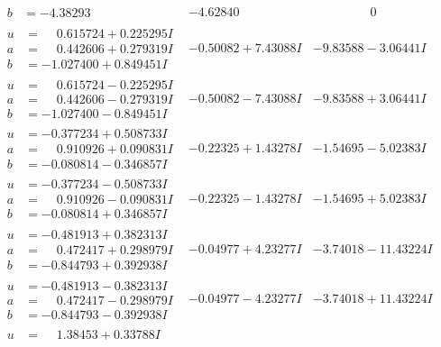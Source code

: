 \documentclass[1p]{elsarticle_modified}
\theoremstyle{definition}
\begin{document}
$$\begin{array}{c|c|c}
\begin{aligned}
b &= -4.38293\phantom{ +0.000000I}\end{aligned}
 & -4.62840\phantom{ +0.000000I} & \phantom{-0.000000 } 0 \\ \hline\begin{aligned}
u &= \phantom{-}0.615724 + 0.225295 I \\
a &= \phantom{-}0.442606 + 0.279319 I \\
b &= -1.027400 + 0.849451 I\end{aligned}
 & -0.50082 + 7.43088 I & -9.83588 - 3.06441 I \\ \hline\begin{aligned}
u &= \phantom{-}0.615724 - 0.225295 I \\
a &= \phantom{-}0.442606 - 0.279319 I \\
b &= -1.027400 - 0.849451 I\end{aligned}
 & -0.50082 - 7.43088 I & -9.83588 + 3.06441 I \\ \hline\begin{aligned}
u &= -0.377234 + 0.508733 I \\
a &= \phantom{-}0.910926 + 0.090831 I \\
b &= -0.080814 - 0.346857 I\end{aligned}
 & -0.22325 + 1.43278 I & -1.54695 - 5.02383 I \\ \hline\begin{aligned}
u &= -0.377234 - 0.508733 I \\
a &= \phantom{-}0.910926 - 0.090831 I \\
b &= -0.080814 + 0.346857 I\end{aligned}
 & -0.22325 - 1.43278 I & -1.54695 + 5.02383 I \\ \hline\begin{aligned}
u &= -0.481913 + 0.382313 I \\
a &= \phantom{-}0.472417 + 0.298979 I \\
b &= -0.844793 + 0.392938 I\end{aligned}
 & -0.04977 + 4.23277 I & -3.74018 - 11.43224 I \\ \hline\begin{aligned}
u &= -0.481913 - 0.382313 I \\
a &= \phantom{-}0.472417 - 0.298979 I \\
b &= -0.844793 - 0.392938 I\end{aligned}
 & -0.04977 - 4.23277 I & -3.74018 + 11.43224 I \\ \hline\begin{aligned}
u &= \phantom{-}1.38453 + 0.33788 I \\

\end{aligned}
\end{array}$$
\end{document}
